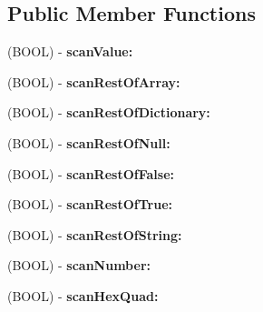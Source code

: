\subsection*{Public Member Functions}
\begin{DoxyCompactItemize}
\item 
\hypertarget{interface_s_b_json_parser_ac636e0452108eb160cef77b66e912b0a}{
(BOOL) -\/ {\bfseries scanValue:}}
\label{interface_s_b_json_parser_ac636e0452108eb160cef77b66e912b0a}

\item 
\hypertarget{interface_s_b_json_parser_a081c4ee408752efed7e907d9f9c2d4ca}{
(BOOL) -\/ {\bfseries scanRestOfArray:}}
\label{interface_s_b_json_parser_a081c4ee408752efed7e907d9f9c2d4ca}

\item 
\hypertarget{interface_s_b_json_parser_a3de09621653a0a1cd940f227d043bacb}{
(BOOL) -\/ {\bfseries scanRestOfDictionary:}}
\label{interface_s_b_json_parser_a3de09621653a0a1cd940f227d043bacb}

\item 
\hypertarget{interface_s_b_json_parser_aeea34f47e63b11e406fa6a7b96108190}{
(BOOL) -\/ {\bfseries scanRestOfNull:}}
\label{interface_s_b_json_parser_aeea34f47e63b11e406fa6a7b96108190}

\item 
\hypertarget{interface_s_b_json_parser_a9b7107e91b570bcb02fb42d1003ead3b}{
(BOOL) -\/ {\bfseries scanRestOfFalse:}}
\label{interface_s_b_json_parser_a9b7107e91b570bcb02fb42d1003ead3b}

\item 
\hypertarget{interface_s_b_json_parser_a246c0a820e6fd69db1bbe79167c578c6}{
(BOOL) -\/ {\bfseries scanRestOfTrue:}}
\label{interface_s_b_json_parser_a246c0a820e6fd69db1bbe79167c578c6}

\item 
\hypertarget{interface_s_b_json_parser_a0b251c81dc2753e3330709af36112429}{
(BOOL) -\/ {\bfseries scanRestOfString:}}
\label{interface_s_b_json_parser_a0b251c81dc2753e3330709af36112429}

\item 
\hypertarget{interface_s_b_json_parser_a40ea5a3426e2af523b6f4355fc41e0e7}{
(BOOL) -\/ {\bfseries scanNumber:}}
\label{interface_s_b_json_parser_a40ea5a3426e2af523b6f4355fc41e0e7}

\item 
\hypertarget{interface_s_b_json_parser_a940e3c61c38e199844bf1a9fbc41138d}{
(BOOL) -\/ {\bfseries scanHexQuad:}}
\label{interface_s_b_json_parser_a940e3c61c38e199844bf1a9fbc41138d}


\end{DoxyCompactItemize}
